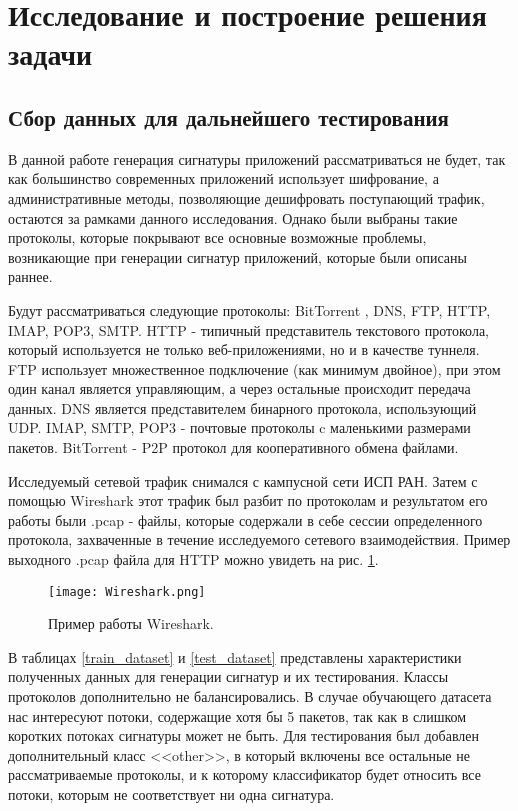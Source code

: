 \section{Исследование и построение решения задачи}
\label{sec:Section3} 

\subsection{Сбор данных для дальнейшего тестирования}

В данной работе генерация сигнатуры приложений рассматриваться не будет,
так как большинство современных приложений использует шифрование, а административные методы,
позволяющие дешифровать поступающий трафик, остаются за рамками данного исследования.
Однако были выбраны такие протоколы, которые покрывают все основные возможные проблемы,
возникающие при генерации сигнатур приложений, которые были описаны раннее.

Будут рассматриваться следующие протоколы: BitTorrent \cite{Bittorent}, DNS, FTP, HTTP, IMAP, POP3, SMTP.
HTTP - типичный представитель текстового протокола, который используется не только веб-приложениями,
но и в качестве туннеля.
FTP использует множественное подключение (как минимум двойное), при этом один канал является управляющим,
а через остальные происходит передача данных. DNS является представителем бинарного протокола, использующий UDP.
IMAP, SMTP, POP3 - почтовые протоколы c маленькими размерами пакетов.
BitTorrent - P2P протокол для кооперативного обмена файлами.

Исследуемый сетевой трафик снимался с кампусной сети ИСП РАН. Затем с помощью Wireshark \cite{Wireshark}
этот трафик был разбит по протоколам и результатом его работы были .pcap - файлы,
которые содержали в себе сессии определенного протокола, захваченные в течение исследуемого сетевого взаимодействия.
Пример выходного .pcap файла для HTTP можно увидеть на рис. \ref{wireshark}.

\begin{figure}[H]
    \begin{center}
        \texttt{[image: Wireshark.png]}
        \caption{Пример работы Wireshark.}\label{wireshark}
    \end{center}
\end{figure}

В таблицах \ref{train_dataset} и \ref{test_dataset} представлены характеристики полученных данных для генерации сигнатур и их тестирования.
Классы протоколов дополнительно не балансировались.
В случае обучающего датасета нас интересуют потоки, содержащие хотя бы 5 пакетов, так как в слишком коротких потоках сигнатуры может не быть.
Для тестирования был добавлен дополнительный класс <<other>>, в который включены
все остальные не рассматриваемые протоколы, и к которому классификатор будет относить все потоки, которым не соответствует ни одна сигнатура.


